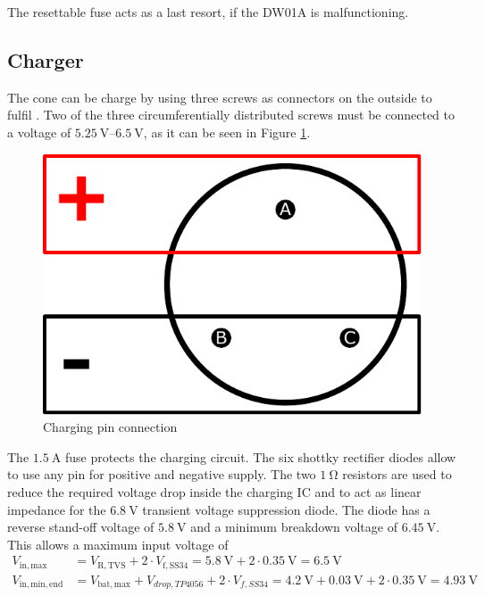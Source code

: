 The resettable fuse acts as a last resort, if the DW01A is malfunctioning.

\FloatBarrier

\subsection{Charger}
\label{sec_charger}

The cone can be charge by using three screws as connectors on the outside to fulfil . Two of the three circumferentially distributed screws must be connected to a voltage of $\qtyrange{5.25}{6.5}{\V}$, as it can be seen in Figure \ref{fig_chg_connection}. 
\begin{figure}[h!]
	\centering
	\includegraphics[scale=0.5]{img/CAD_Charging.pdf}
	\caption{Charging pin connection}
	\label{fig_chg_connection}
\end{figure}
The $\SI{1.5}{\A}$ fuse protects the charging circuit. The six shottky rectifier diodes allow to use any pin for positive and negative supply. The two $\SI{1}{\ohm}$ resistors are used to reduce the required voltage drop inside the charging IC and to act as linear impedance for the $\SI{6.8}{\V}$ transient voltage suppression diode. The diode has a reverse stand-off voltage of $\SI{5.8}{\V}$ and a minimum breakdown voltage of $\SI{6.45}{\V}$. 
This allows a maximum input voltage of 
\begin{align}
	V_\mathrm{in,max} &= V_\mathrm{R,TVS} + 2\cdot V_\mathrm{f,SS34} = \SI{5.8}{\V}+ 2\cdot \SI{0.35}{\V}=\SI{6.5}{\V}\\
	V_\mathrm{in,min,end} &= V_\mathrm{bat,max} + V_{drop, TP4056} + 2\cdot V_{f,SS34} = \SI{4.2}{\V} + \SI{0.03}{\V} + 2\cdot \SI{0.35}{\V} = \SI{4.93}{\V}
\end{align}
